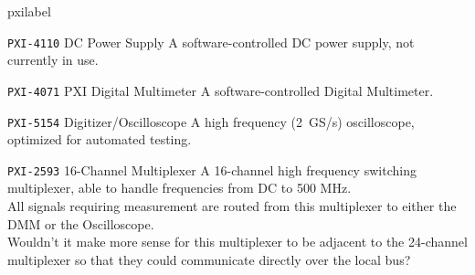 \begin{labelled}{pxilabel}
  \item[\pxislotn{4} \texttt{PXI-4110}\hspace{.25em} DC Power Supply]
    A software-controlled DC power supply, not currently in use.

  \item[\pxislotn{5} \texttt{PXI-4071}\hspace{.25em} PXI Digital Multimeter]
    A software-controlled Digital Multimeter.  

  \item[\pxislotn{6} \texttt{PXI-5154}\hspace{.25em} Digitizer/Oscilloscope]
    A high frequency (2~GS/s) oscilloscope, optimized for automated testing.

  \item[\pxislotn{7} \texttt{PXI-2593}\hspace{.25em} 16-Channel Multiplexer]
    A 16-channel high frequency switching multiplexer, able to handle frequencies from DC to 500 MHz.\\\noindent
    \FIXME All signals requiring measurement are routed from this multiplexer to either the DMM or the Oscilloscope.\\\noindent
    \FIXME Wouldn't it make more sense for this multiplexer to be adjacent to the 24-channel multiplexer so that they could communicate directly over the local bus?

\end{labelled}






